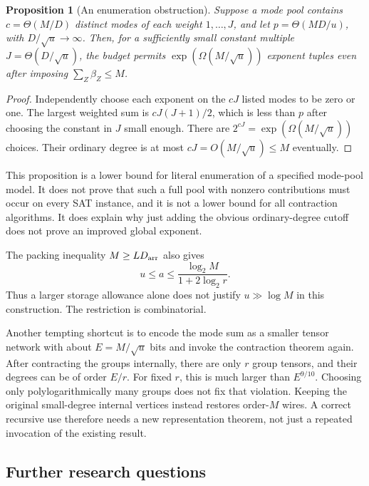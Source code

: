 \documentclass[11pt]{article}
\newtheorem{proposition}[theorem]{Proposition}
\theoremstyle{remark}
\begin{document}
\begin{proposition}[An enumeration obstruction]
Suppose a mode pool contains $c=\Theta(M/D)$ distinct modes of each weight $1,\ldots,J$, and let $p=\Theta(MD/u)$, with $D/\sqrt u\to\infty$. Then, for a sufficiently small constant multiple $J=\Theta(D/\sqrt u)$, the budget permits $\exp(\Omega(M/\sqrt u))$ exponent tuples even after imposing $\sum_Z\beta_Z\le M$.
\end{proposition}
\begin{proof}
Independently choose each exponent on the $cJ$ listed modes to be zero or one. The largest weighted sum is $cJ(J+1)/2$, which is less than $p$ after choosing the constant in $J$ small enough. There are $2^{cJ}=\exp(\Omega(M/\sqrt u))$ choices. Their ordinary degree is at most $cJ=O(M/\sqrt u)\le M$ eventually.
\end{proof}

This proposition is a lower bound for literal enumeration of a specified mode-pool model. It does not prove that such a full pool with nonzero contributions must occur on every SAT instance, and it is not a lower bound for all contraction algorithms. It does explain why just adding the obvious ordinary-degree cutoff does not prove an improved global exponent.

The packing inequality $M\ge LD_{\rm arr}$ also gives
\[
 u\le a\le\frac{\log_2M}{1+2\log_2r}.
\]
Thus a larger storage allowance alone does not justify $u\gg\log M$ in this construction. The restriction is combinatorial.

Another tempting shortcut is to encode the mode sum as a smaller tensor network with about $E=M/\sqrt u$ bits and invoke the contraction theorem again. After contracting the groups internally, there are only $r$ group tensors, and their degrees can be of order $E/r$. For fixed $r$, this is much larger than $E^{9/10}$. Choosing only polylogarithmically many groups does not fix that violation. Keeping the original small-degree internal vertices instead restores order-$M$ wires. A correct recursive use therefore needs a new representation theorem, not just a repeated invocation of the existing result.

\subsection{Further research questions}
\end{document}
